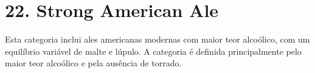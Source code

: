 \section*{22. Strong American Ale}

Esta categoria inclui ales americanas modernas com maior teor alcoólico, com um equilíbrio variável de malte e lúpulo. A categoria é definida principalmente pelo maior teor alcoólico e pela ausência de torrado.
